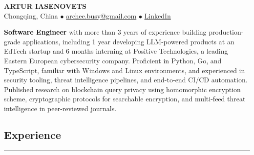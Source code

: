\documentclass[11pt,letterpaper]{article}
\begin{document}
\begin{center}
    {\LARGE \textbf{ARTUR IASENOVETS}} \\
    \vspace{0.1cm}
    Chongqing, China $\bullet$
    \href{mailto:archee.busy@gmail.com}{archee.busy@gmail.com} $\bullet$
    \href{https://linkedin.com/in/iasenovets}{LinkedIn}
\end{center}

\vspace{0.2cm}

\noindent
\textbf{Software Engineer} with more than 3 years of experience building production-grade applications,
including 1 year developing LLM-powered products at an EdTech startup and 6 months interning
at Positive Technologies, a leading Eastern European cybersecurity company. Proficient in Python, Go, and TypeScript,
familiar with Windows and Linux environments, and experienced in security tooling, threat intelligence pipelines,
and end-to-end CI/CD automation. Published research on blockchain query privacy using homomorphic encryption scheme,
cryptographic protocols for searchable encryption, and multi-feed threat intelligence in peer-reviewed journals.

\vspace{0.3cm}

\subsection*{\Large Experience}
\vspace{-0.5em}
\hrule
\vspace{0.3em}
\end{document}
